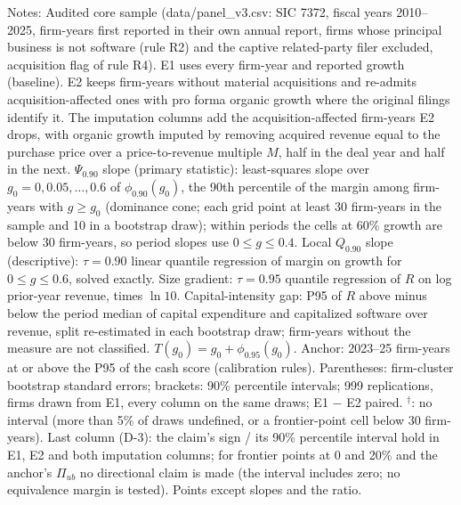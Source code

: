 \begin{table}[t]
\par\vspace{2pt}\footnotesize\raggedright Notes: Audited core sample (data/panel\_v3.csv: SIC 7372, fiscal years 2010--2025, firm-years first reported in their own annual report, firms whose principal business is not software (rule R2) and the captive related-party filer excluded, acquisition flag of rule R4). E1 uses every firm-year and reported growth (baseline). E2 keeps firm-years without material acquisitions and re-admits acquisition-affected ones with pro forma organic growth where the original filings identify it. The imputation columns add the acquisition-affected firm-years E2 drops, with organic growth imputed by removing acquired revenue equal to the purchase price over a price-to-revenue multiple $M$, half in the deal year and half in the next. $\Psi_{0.90}$ slope (primary statistic): least-squares slope over $g_0=0,0.05,\dots,0.6$ of $\phi_{0.90}(g_0)$, the 90th percentile of the margin among firm-years with $g\geq g_0$ (dominance cone; each grid point at least 30 firm-years in the sample and 10 in a bootstrap draw); within periods the cells at 60\% growth are below 30 firm-years, so period slopes use $0\leq g\leq0.4$. Local $Q_{0.90}$ slope (descriptive): $\tau=0.90$ linear quantile regression of margin on growth for $0\leq g\leq0.6$, solved exactly. Size gradient: $\tau=0.95$ quantile regression of $R$ on log prior-year revenue, times $\ln 10$. Capital-intensity gap: P95 of $R$ above minus below the period median of capital expenditure and capitalized software over revenue, split re-estimated in each bootstrap draw; firm-years without the measure are not classified. $T(g_0)=g_0+\phi_{0.95}(g_0)$. Anchor: 2023--25 firm-years at or above the P95 of the cash score (calibration rules). Parentheses: firm-cluster bootstrap standard errors; brackets: 90\% percentile intervals; 999 replications, firms drawn from E1, every column on the same draws; E1 $-$ E2 paired. $^\dagger$: no interval (more than 5\% of draws undefined, or a frontier-point cell below 30 firm-years). Last column (D-3): the claim's sign / its 90\% percentile interval hold in E1, E2 and both imputation columns; for frontier points at 0 and 20\% and the anchor's $\Pi_{ub}$ no directional claim is made (the interval includes zero; no equivalence margin is tested). Points except slopes and the ratio.
\end{table}